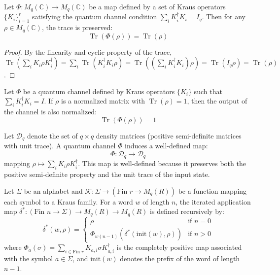 \begin{lemma}
Let $\Phi: M_q(\mathbb{C}) \to M_q(\mathbb{C})$ be a map defined by a set of Kraus operators $\{K_i\}_{i=1}^r$ satisfying the quantum channel condition $\sum_i K_i^\dagger K_i = I_q$. Then for any $\rho \in M_q(\mathbb{C})$, the trace is preserved:
\begin{equation}
    \operatorname{Tr}(\Phi(\rho)) = \operatorname{Tr}(\rho)
\end{equation}
\end{lemma}

\begin{proof}
By the linearity and cyclic property of the trace, $\operatorname{Tr}(\sum_i K_i \rho K_i^\dagger) = \sum_i \operatorname{Tr}(K_i^\dagger K_i \rho) = \operatorname{Tr}((\sum_i K_i^\dagger K_i) \rho) = \operatorname{Tr}(I_q \rho) = \operatorname{Tr}(\rho)$.
\end{proof}

\begin{proposition}
Let $\Phi$ be a quantum channel defined by Kraus operators $\{K_i\}$ such that $\sum_i K_i^\dagger K_i = I$. If $\rho$ is a normalized matrix with $\operatorname{Tr}(\rho) = 1$, then the output of the channel is also normalized:
\begin{equation}
    \operatorname{Tr}(\Phi(\rho)) = 1
\end{equation}
\end{proposition}

\begin{definition}
Let $\mathcal{D}_q$ denote the set of $q \times q$ density matrices (positive semi-definite matrices with unit trace). A quantum channel $\Phi$ induces a well-defined map:
\begin{equation}
    \Phi: \mathcal{D}_q \to \mathcal{D}_q
\end{equation}
mapping $\rho \mapsto \sum_i K_i \rho K_i^\dagger$. This map is well-defined because it preserves both the positive semi-definite property and the unit trace of the input state.
\end{definition}


\begin{definition}
Let $\Sigma$ be an alphabet and $\mathcal{K} : \Sigma \to (\text{Fin } r \to M_q(R))$ be a function mapping each symbol to a Kraus family. For a word $w$ of length $n$, the iterated application map $\delta^* : (\text{Fin } n \to \Sigma) \to M_q(R) \to M_q(R)$ is defined recursively by:
\begin{equation}
    \delta^*(w, \rho) = 
    \begin{cases} 
      \rho & \text{if } n = 0 \\
      \Phi_{w(n-1)} \left( \delta^*(\text{init}(w), \rho) \right) & \text{if } n > 0
    \end{cases}
\end{equation}
where $\Phi_{a}(\sigma) = \sum_{i \in \text{Fin } r} K_{a,i} \sigma K_{a,i}^\dagger$ is the completely positive map associated with the symbol $a \in \Sigma$, and $\text{init}(w)$ denotes the prefix of the word of length $n-1$.
\end{definition}


